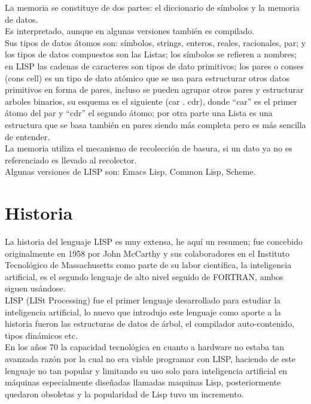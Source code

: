 \documentclass[11pt]{article} %
\begin{document}
La memoria se constituye de dos partes: el diccionario de símbolos y la memoria de datos. \\
Es interpretado, aunque en algunas versiones también es compilado.\\
Sus tipos de datos átomos son: símbolos,  strings, enteros, reales, racionales, par; y los tipos de
datos compuestos son las Listas; los símbolos se refieren a nombres; en LISP las cadenas de
caracteres son tipos de dato primitivos; los pares o conses (cons cell) es un tipo de dato
atómico que se usa para estructurar otros datos primitivos en forma de pares, incluso se 
pueden agrupar otros pares y estructurar arboles binarios, su esquema es el siguiente 
(car . cdr), donde “car” es el primer átomo del par y “cdr” el segundo átomo; por otra parte una 
Lista es una estructura que se basa también en pares siendo más completa pero es más sencilla de entender. \\

La memoria utiliza el mecanismo de recolección de basura, si un dato ya no es referenciado es
llevado al recolector. \\
Algunas versiones de LISP son: Emacs Lisp, Common Lisp, Scheme.\\



\section{Historia}
La historia del lenguaje LISP es muy extensa, he aquí un resumen; fue concebido originalmente en 1958 por  
John McCarthy y sus colaboradores en el Instituto Tecnológico de Massachusetts como parte de su labor científica, 
la inteligencia artificial, es el segundo lenguaje de alto nivel seguido de FORTRAN, ambos siguen usándose. \\

LISP (LISt Processing) fue el primer lenguaje desarrollado para estudiar la inteligencia
artificial, lo nuevo que introdujo este lenguaje como aporte a la historia fueron las estructuras
de datos de árbol, el compilador auto-contenido, tipos dinámicos etc.\\

En los años 70 la capacidad tecnológica en cuanto a hardware no estaba tan avanzada razón
por la cual no era viable programar con LISP, haciendo de este lenguaje no tan popular y 
limitando su uso solo para inteligencia artificial en máquinas especialmente diseñadas
llamadas maquinas Lisp, posteriormente quedaron obsoletas y la popularidad de Lisp tuvo
un incremento. \\
\end{document}
